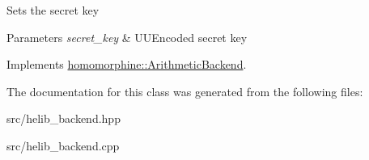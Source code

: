 Sets the secret key


\begin{DoxyParams}{Parameters}
{\em secret\+\_\+key} & U\+U\+Encoded secret key \\
\hline
\end{DoxyParams}


Implements \mbox{\hyperlink{classhomomorphine_1_1_arithmetic_backend_a0bb3c2728df4662c6472d4d43215410f}{homomorphine\+::\+Arithmetic\+Backend}}.



The documentation for this class was generated from the following files\+:\begin{DoxyCompactItemize}
\item 
src/helib\+\_\+backend.\+hpp\item 
src/helib\+\_\+backend.\+cpp\end{DoxyCompactItemize}

